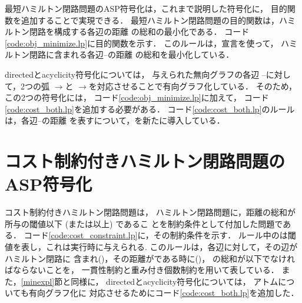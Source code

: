 

最短ハミルトン閉路問題のASP符号化は，これまで説明した符号化に，
目的関数を追加することで実現できる．
最短ハミルトン閉路問題の目的関数は，ハミルトン閉路を構成する各辺の距離
の総和の最小化である．
コード\ref{code:obj_minimize.lp}に目的関数を示す．
このルールは，宣言を使って，
ハミルトン閉路に含まれる各辺--の距離
の総和を最小化している．

\textsf{directed}と\textsf{acyclicity}符号化については，
与えられた無向グラフの各辺
--に対して，2つの弧
$\rightarrow$と
$\rightarrow$を対応させることで有向グラフ化している．
そのため，この2つの符号化には，
コード\ref{code:obj_minimize.lp}に加えて，
コード\ref{code:cost_both.lp}を追加する必要がある．
コード\ref{code:cost_both.lp}のルールは，各辺--の距離
を表すについて，を新たに導入している．

\section{コスト制約付きハミルトン閉路問題のASP符号化}



コスト制約付きハミルトン閉路問題は，
ハミルトン閉路問題に，距離の総和が所与の閾値以下 (または以上) であるこ
とを制約条件として付加した問題である．
コード\ref{code:cost_constraint.lp}に，その制約条件を示す．
ルール中のは閾値を表し，これは実行時に与えられる.
このルールは，各辺に対して，その辺がハミルトン閉路に
含まれ()，その距離がである時に()，
の総和が以下でなければならないことを，
一貫性制約と重み付き個数制約を用いて表している．
また，\ref{minexpl}節と同様に，
\textsf{directed}と\textsf{acyclicity}符号化については，
アトムについても有向グラフ化に
対応させるためにコード\ref{code:cost_both.lp}を追加した．

